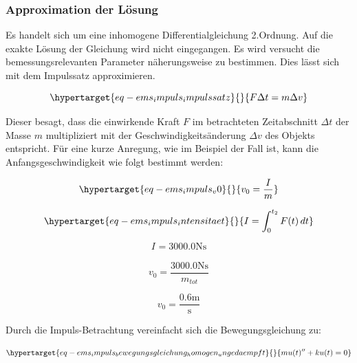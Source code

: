\documentclass[
  letterpaper,
  DIV=11]{scrreprt}
\begin{document}
\hypertarget{approximation-der-luxf6sung}{%
\subsubsection{Approximation der
Lösung}\label{approximation-der-luxf6sung}}

Es handelt sich um eine inhomogene Differentialgleichung 2.Ordnung. Auf
die exakte Lösung der Gleichung wird nicht eingegangen. Es wird versucht
die bemessungsrelevanten Parameter näherungsweise zu bestimmen. Dies
lässt sich mit dem Impulssatz approximieren.

\begin{equation}\protect\hypertarget{eq-ems_impuls_impulssatz}{}{
F \Delta t = m \Delta v
}\label{eq-ems_impuls_impulssatz}\end{equation}

Dieser besagt, dass die einwirkende Kraft \(F\) im betrachteten
Zeitabschnitt \(\Delta t\) der Masse \(m\) multipliziert mit der
Geschwindigkeitsänderung \(\Delta v\) des Objekts entspricht. Für eine
kurze Anregung, wie im Beispiel der Fall ist, kann die
Anfangsgeschwindigkeit wie folgt bestimmt werden:

\begin{equation}\protect\hypertarget{eq-ems_impuls_v0}{}{
v_0 = \frac{I}{m}
}\label{eq-ems_impuls_v0}\end{equation}

\begin{equation}\protect\hypertarget{eq-ems_impuls_intensitaet}{}{
I = \int_{0}^{t_2} F(t) \,dt
}\label{eq-ems_impuls_intensitaet}\end{equation}

\begin{equation}I_{} = 3000.0 \text{N} \text{s}\end{equation}

\begin{equation}v_{0} = \frac{3000.0 \text{N} \text{s}}{m_{tot}}\end{equation}

\begin{equation}v_{0} = \frac{0.6 \text{m}}{\text{s}}\end{equation}

Durch die Impuls-Betrachtung vereinfacht sich die Bewegungsgleichung zu:

\begin{equation}\protect\hypertarget{eq-ems_impuls_bewegungsgleichung_homogen_ungedaempft}{}{
m u(t)'' + k u(t) = 0
}\label{eq-ems_impuls_bewegungsgleichung_homogen_ungedaempft}\end{equation}
\end{document}
